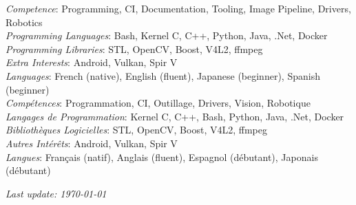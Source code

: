 \documentclass{article}
\begin{document}
\begin{llist}
 {
{\em Competence}: Programming, CI, Documentation, Tooling, Image Pipeline, Drivers, Robotics \\
{\em Programming Languages}: Bash, Kernel C, C++, Python, Java, .Net, Docker \\
{\em Programming Libraries}: STL, OpenCV, Boost, V4L2, ffmpeg \\
{\em Extra Interests}: Android, Vulkan, Spir V \\
{\em Languages}: French (native), English (fluent), Japanese (beginner), Spanish (beginner) \\
} {
{\em Comp\'{e}tences}: Programmation, CI, Outillage, Drivers, Vision, Robotique \\
{\em Langages de Programmation}: Kernel C, C++, Bash, Python, Java, .Net, Docker \\
{\em Biblioth\`{e}ques Logicielles}: STL, OpenCV, Boost, V4L2, ffmpeg \\
{\em Autres Int\'{e}r\^{e}ts}: Android, Vulkan, Spir V \\
{\em Langues}: Fran\c{c}ais (natif), Anglais (fluent), Espagnol (d\'{e}butant), Japonais (d\'{e}butant) \\
}

 {
} {
}

\end{llist}

{\em Last update: \today}
\end{document}
